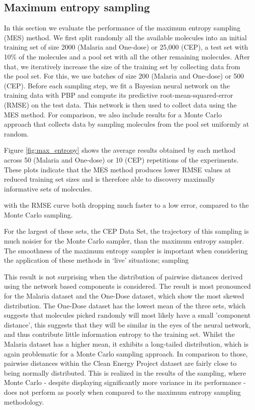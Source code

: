 \subsection{Maximum entropy sampling}

In this section we evaluate the performance of the maximum entropy sampling (MES) method. We first split randomly all the available molecules into an initial training set of size 2000 (Malaria and One-dose) or 25,000 (CEP), a test set with 10\% of the molecules and a pool set with all the other remaining molecules. After that, we iteratively increase the size of the training set by collecting data from the pool set. For this, we use batches of size 200 (Malaria and One-dose) or 500 (CEP). Before each sampling step, we fit a Bayesian neural network on the training data with PBP and compute its predictive root-mean-squared-error (RMSE) on the test data. This network is then used to collect data using the MES method. For comparison, we also include results for a Monte Carlo approach that collects data by sampling molecules from the pool set uniformly at random.

Figure \ref{fig:max_entropy} shows the average results obtained by each method across 50 (Malaria and One-dose) or 10 (CEP) repetitions of the experiments. These plots indicate that the MES method produces lower RMSE values at reduced training set sizes and is therefore able to discovery maximally informative sets of molecules.

with the RMSE curve both dropping much faster to a low error, compared to the Monte Carlo sampling.  

For the largest of these sets, the CEP Data Set, the trajectory of this sampling is much noisier for the Monte Carlo sampler, than the maximum entropy sampler.  The smoothness of the maximum entropy sampler is important when considering the application of these methods in `live' situations; sampling 

This result is not surprising when the distribution of pairwise distances derived using the network based components is considered. The result is most pronounced for the Malaria dataset and the One-Dose dataset, which show the most skewed distribution.  The One-Dose dataset has the lowest mean of the three sets, which suggests that molecules picked randomly will most likely have a small 'component distance', this suggests that they will be similar in the eyes of the neural network, and thus contribute little information entropy to the training set. Whilst the Malaria dataset has a higher mean, it exhibits a long-tailed distribution, which is again problematic for a Monte Carlo sampling approach.  In comparison to those, pairwise distances within the Clean Energy Project dataset are fairly close to being normally distributed.  This is realized in the results of the sampling, where Monte Carlo - despite displaying significantly more variance in its performance - does not perform as poorly when compared to the maximum entropy sampling methodology.

